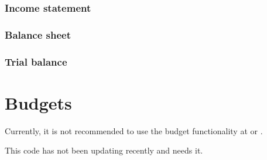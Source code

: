 \subsection{Income statement}
\label{subsec-business-processes-accounting-reporting-result}


\subsection{Balance sheet}
\label{subsec-business-processes-accounting-reporting-balance}

\subsection{Trial balance}
\label{subsec-business-processes-accounting-reporting-trial-balance}

\chapter{Budgets}
\label{cha-business-processes-budget}

Currently, it is not recommended to use the budget  functionality at  or .

This code has not been updating recently and needs it.
